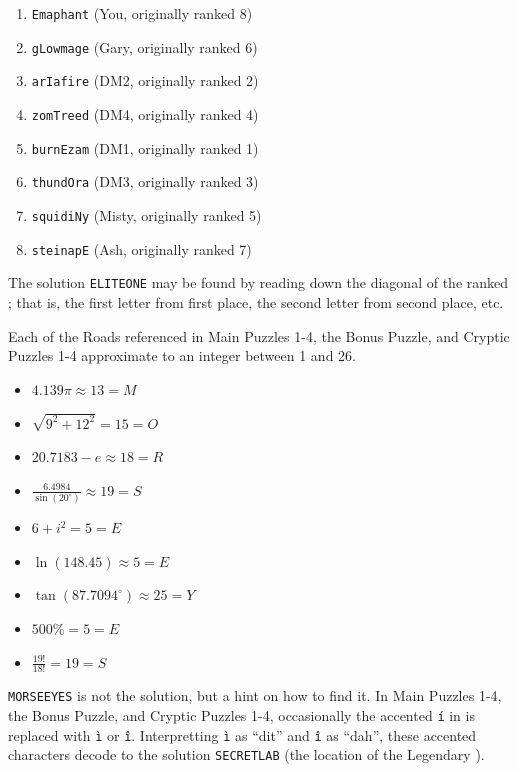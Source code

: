 \begin{multicols}{2}
\begin{enumerate}
  \item \texttt{Emaphant} (You, originally ranked 8)
  \item \texttt{gLowmage} (Gary, originally ranked 6)
  \item \texttt{arIafire} (DM2, originally ranked 2)
  \item \texttt{zomTreed} (DM4, originally ranked 4)
  \item \texttt{burnEzam} (DM1, originally ranked 1)
  \item \texttt{thundOra} (DM3, originally ranked 3)
  \item \texttt{squidiNy} (Misty, originally ranked 5)
  \item \texttt{steinapE} (Ash, originally ranked 7)
\end{enumerate}
\end{multicols}

The solution \texttt{ELITEONE} may be found by reading down the diagonal of the
ranked \mappMobimon{}; that is, the first letter from first place, the second
letter from second place, etc.


Each of the Roads referenced in Main Puzzles 1-4, the Bonus Puzzle,
and Cryptic Puzzles 1-4 approximate to an integer between 1 and 26.

\begin{multicols}{3}
\begin{itemize}
  \item \(4.139\pi\approx13=M\)
  \item \(\sqrt{9^2+12^2}=15=O\)
  \item \(20.7183-e\approx18=R\)
  \item \(\frac{6.4984}{\sin(20^\circ)}\approx19=S\)
  \item \(6+i^2=5=E\)
  \item \(\ln(148.45)\approx5=E\)
  \item \(\tan(87.7094^\circ)\approx25=Y\)
  \item \(500\%=5=E\)
  \item \(\frac{19!}{18!}=19=S\)
\end{itemize}
\end{multicols}

\texttt{MORSEEYES} is not the solution, but a hint on how to find it.
In Main Puzzles 1-4, the Bonus Puzzle, and Cryptic Puzzles 1-4, occasionally
the accented \texttt{\'i} in \mappMobimon{} is replaced with
\texttt{\`i} or \texttt{\^i}. Interpretting \texttt{\`i} as ``dit'' and
\texttt{\^i} as ``dah'', these accented characters decode to the solution
\texttt{SECRETLAB} (the location of the Legendary \mappMobimon{}).

